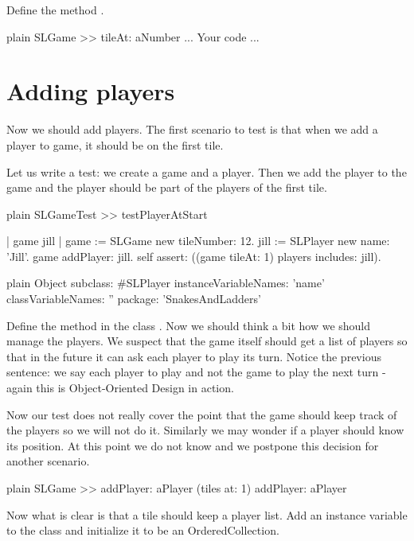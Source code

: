 \documentclass[10pt,twoside,english]{_support/latex/sbabook/sbabook}
\begin{document}
Define the method .

\begin{displaycode}{plain}
SLGame >> tileAt: aNumber
	... Your code ...
\end{displaycode}
\section{Adding players}
Now we should add players. The first scenario to test is that when we add a player to game, it should be on the first tile.

Let us write a test: we create a game and a player. Then we add the player to the game and the player should be part of the players of the first tile. 

\begin{displaycode}{plain}
SLGameTest >> testPlayerAtStart

	| game jill |
	game := SLGame new tileNumber: 12.
	jill := SLPlayer new name: 'Jill'.
	game addPlayer: jill. 
	self assert: ((game tileAt: 1) players includes: jill).
\end{displaycode}

\begin{displaycode}{plain}
Object subclass: #SLPlayer
	instanceVariableNames: 'name'
	classVariableNames: ''
	package: 'SnakesAndLadders'
\end{displaycode}

Define the method  in the class .
Now we should think a bit how we should manage the players. 
We suspect that the game itself should get a list of players so that in the future it can ask each player to play its turn. Notice the previous sentence: we say each player to play and not the game to play the next turn - again this is Object-Oriented Design in action.

Now our test does not really cover the point that the game should keep track of the players
so we will not do it. Similarly we may wonder if a player should know its position. At this point we do not know and we postpone this decision for another scenario.

\begin{displaycode}{plain}
SLGame >> addPlayer: aPlayer	
	(tiles at: 1) addPlayer: aPlayer
\end{displaycode}

Now what is clear is that a tile should keep a player list. Add an instance variable  to the  class and initialize it to be an OrderedCollection. 
\end{document}
